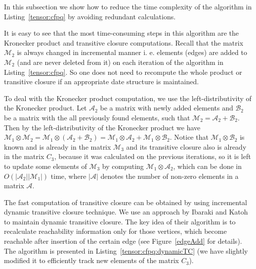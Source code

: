 In this subsection we show how to reduce the time complexity of the algorithm in Listing~\ref{tensor:cfpq} by avoiding redundant calculations. 


It is easy to see that the most time-consuming steps in this algorithm are the Kronecker product and transitive closure computations. Recall that the matrix $\mathcal{M}_2$ is always changed in incremental manner i. e. elements (edges) are added to $\mathcal{M}_2$ (and are never deleted from it) on each iteration of the algorithm in Listing~\ref{tensor:cfpq}. So one does not need to recompute the whole product or transitive closure if an appropriate date structure is maintained.


To deal with the Kronecker product computation, we use the left-distributivity of the Kronecker product. Let $\mathcal{A}_2$ be a matrix with newly added elements and $\mathcal{B}_2$ be a matrix with the all previously found elements, such that $\mathcal{M}_2 = \mathcal{A}_2 + \mathcal{B}_2$. Then by the left-distributivity of the Kronecker product we have $\mathcal{M}_1 \otimes \mathcal{M}_2 = \mathcal{M}_1 \otimes (\mathcal{A}_2 + \mathcal{B}_2) = \mathcal{M}_1\otimes \mathcal{A}_2 + \mathcal{M}_1 \otimes \mathcal{B}_2$. Notice that $\mathcal{M}_1 \otimes \mathcal{B}_2$ is known and is already in the matrix $\mathcal{M}_3$ and its transitive closure also is already in the matrix $C_3$, because it was calculated on the previous iterations, so it is left to update some elements of $\mathcal{M}_3$ by computing $\mathcal{M}_1\otimes \mathcal{A}_2$, which can be done in $O(|\mathcal{A}_2||\mathcal{M}_1|)$ time, where $|\mathcal{A}|$ denotes the number of non-zero elements in a matrix $\mathcal{A}$.


The fast computation of transitive closure can be obtained by using incremental dynamic transitive closure technique. We use an approach by Ibaraki and Katoh~\cite{IBARAKI198395} to maintain dynamic transitive closure. The key idea of their algorithm is to recalculate reachability information only for those vertices, which become reachable after insertion of the certain edge (see Figure~\ref{edgeAdd} for details). The algorithm is presented in Listing~\ref{tensor:cfpq:dynamicTC} (we have slightly modified it to efficiently track new elements of the matrix $C_3$). 


